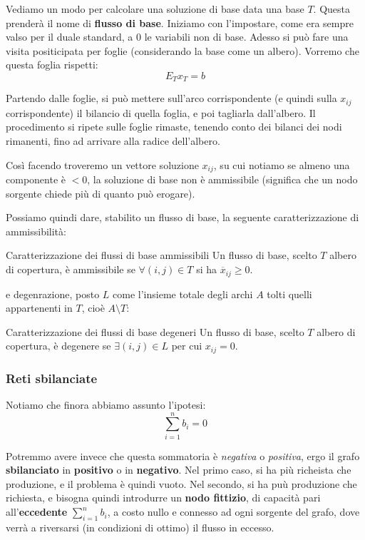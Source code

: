 \documentclass[a4paper,11pt]{article}
\begin{document}
Vediamo un modo per calcolare una soluzione di base data una base $T$.
Questa prenderà il nome di \textbf{flusso di base}.
Iniziamo con l'impostare, come era sempre valso per il duale standard, a 0 le variabili non di base.
Adesso si può fare una visita positicipata per foglie (considerando la base come un albero).
Vorremo che questa foglia rispetti:
$$
E_T x_T = b
$$

Partendo dalle foglie, si può mettere sull'arco corrispondente (e quindi sulla $x_{ij}$ corrispondente) il bilancio di quella foglia, e poi tagliarla dall'albero.
Il procedimento si ripete sulle foglie rimaste, tenendo conto dei bilanci dei nodi rimanenti, fino ad arrivare alla radice dell'albero.

Così facendo troveremo un vettore soluzione $x_{ij}$, su cui notiamo se almeno una componente è $< 0$, la soluzione di base non è ammissibile (significa che un nodo sorgente chiede più di quanto può erogare).

Possiamo quindi dare, stabilito un flusso di base, la seguente caratterizzazione di ammissibilità:

\begin{definition}{Caratterizzazione dei flussi di base ammissibili}
	Un flusso di base, scelto $T$ albero di copertura, è ammissibile se $\forall (i, j) \in T$ si ha $ \overline{x}_{ij} \geq 0$.
\end{definition}

e degenrazione, posto $L$ come l'insieme totale degli archi $A$ tolti quelli appartenenti in $T$, cioè $A \setminus T$:

\begin{definition}{Caratterizzazione dei flussi di base degeneri}
	Un flusso di base, scelto $T$ albero di copertura, è degenere se $\exists (i, j) \in L$ per cui $x_{ij} = 0$. 
\end{definition}

\subsubsection{Reti sbilanciate}
Notiamo che finora abbiamo assunto l'ipotesi:
$$
\sum_{i=1}^n b_i = 0
$$

Potremmo avere invece che questa sommatoria è \textit{negativa} o \textit{positiva}, ergo il grafo \textbf{sbilanciato} in \textbf{positivo} o in \textbf{negativo}.
Nel primo caso, si ha più richeista che produzione, e il problema è quindi vuoto.
Nel secondo, si ha puù produzione che richiesta, e bisogna quindi introdurre un \textbf{nodo fittizio}, di capacità pari all'\textbf{eccedente} $\sum_{i=1}^n b_i$, a costo nullo e connesso ad ogni sorgente del grafo, dove verrà a riversarsi (in condizioni di ottimo) il flusso in eccesso. 
\end{document}
